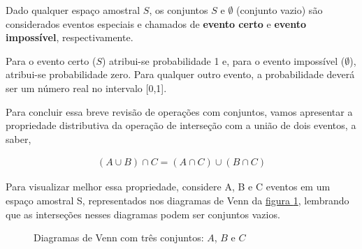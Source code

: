 Dado qualquer espaço amostral \(S\), os conjuntos \(S\) e \(\emptyset\) (conjunto vazio) são considerados eventos especiais e chamados de \textbf{evento certo} e \textbf{evento impossível}, respectivamente.

Para o evento certo (\(S\)) atribui-se probabilidade 1 e, para o evento impossível (\(\emptyset\)), atribui-se probabilidade zero. Para qualquer outro evento, a probabilidade deverá ser um número real no intervalo {[}0,1{]}.

Para concluir essa breve revisão de operações com conjuntos, vamos apresentar a propriedade distributiva da operação de interseção com a união de dois eventos, a saber,

\begin{equation*}
\begin{split}(A\cup B)\cap C=(A\cap C)\cup (B\cap C)\end{split}
\end{equation*}

Para visualizar melhor essa propriedade, considere A, B e C eventos em um espaço amostral S, representados nos diagramas de Venn da \hyperref[diagramasvenn2]{figura \ref{diagramasvenn2}}, lembrando que as interseções nesses diagramas podem ser conjuntos vazios.

\begin{figure}[H]
\centering
\begin{minipage}{0.35\textwidth}
\centering
{}

\end{minipage}
\begin{minipage}{0.35\textwidth}
\centering
{}

\end{minipage}
\caption{Diagramas de Venn com três conjuntos: \(A\), \(B\)  e \(C\)}
\label{diagramasvenn2}
\end{figure}





